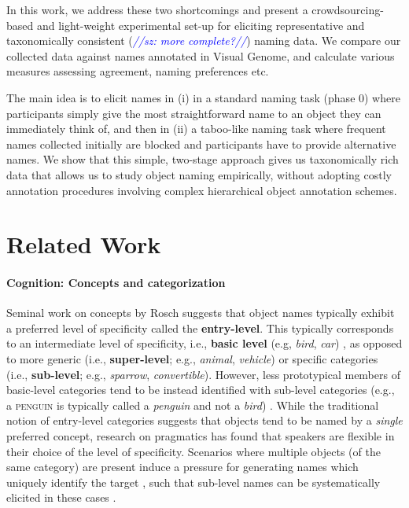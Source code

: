 \documentclass[11pt]{article}
\newcommand{\sz}[1]{\textcolor{blue}{\emph{//sz: #1//}}}
\newcommand{\refexp}[1]{\textsl{#1}}
\newcommand{\cat}[1]{\textsc{#1}}
\begin{document}
In this work, we address these two shortcomings and present a crowdsourcing-based and light-weight experimental set-up for eliciting representative and taxonomically consistent (\sz{more complete?}) naming data. We compare our collected data against names annotated in Visual Genome, and calculate various measures assessing agreement, naming preferences etc.

The main idea is to elicit names in (i) in a standard naming task (phase 0) where participants simply give the most straightforward name to an object they can immediately think of, and then in (ii) a taboo-like naming task where frequent names collected initially are blocked and participants have to provide alternative names. We show that this simple, two-stage approach gives us taxonomically rich data that allows us to study object naming empirically, without adopting costly annotation procedures involving complex hierarchical object annotation schemes.


\section{Related Work}
\label{sec:related}

\paragraph{Cognition: Concepts and categorization}

 Seminal work on concepts by Rosch suggests that object names typically exhibit a preferred level of specificity called the \textbf{entry-level}. This typically corresponds to an intermediate level of specificity, i.e., \textbf{basic level} (e.g, \refexp{bird}, \refexp{car}) \cite{rosch1976basic}, as opposed to more generic (i.e., \textbf{super-level}; e.g., \refexp{animal}, \refexp{vehicle}) or specific categories (i.e., \textbf{sub-level}; e.g., \refexp{sparrow}, \refexp{convertible}). However, less prototypical members of basic-level categories tend to be instead identified with sub-level categories (e.g., a \cat{penguin} is typically called a \refexp{penguin} and not a \refexp{bird}) \cite{jolicoeur1984pictures}. 
While the traditional notion of entry-level categories suggests that objects tend to be named by a \refexp{single} preferred concept, research on pragmatics has found that speakers are flexible in  
their choice of the level of specificity. 
Scenarios where multiple objects (of the same category) are present induce a pressure for generating names which uniquely identify the target \cite{olson1970language}, such that sub-level names can be systematically elicited in these cases %
\cite{rohde2012communicating,graf2016animal}.
\end{document}
